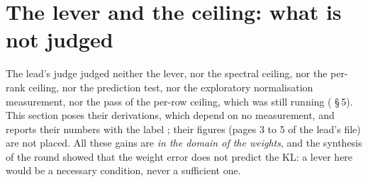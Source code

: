 \section{The lever and the ceiling: what is not judged}\label{t3spe:sec:levier}

The lead's judge judged neither the lever, nor the spectral ceiling, nor the per-rank ceiling, nor the prediction test, nor the exploratory normalisation measurement, nor the pass of the per-row ceiling, which was still running ( §\,5). This section poses their derivations, which depend on no measurement, and reports their numbers with the label ; their figures (pages 3 to 5 of the lead's file) are not placed. All these gains are \emph{in the domain of the weights}, and the synthesis of the round showed that the weight error does not predict the KL: a lever here would be a necessary condition, never a sufficient one.


